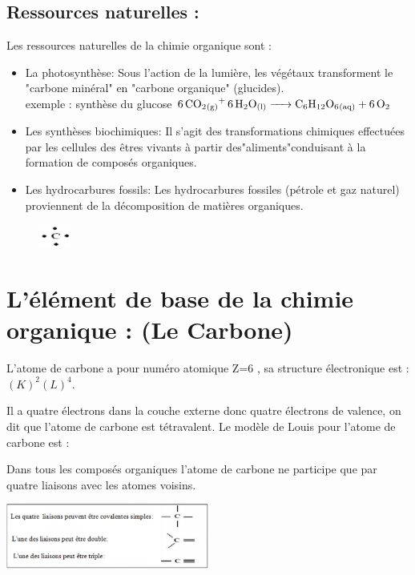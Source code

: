 \documentclass[12pt]{article}
\begin{document}
  \subsection{Ressources naturelles : }
Les ressources naturelles de la chimie organique sont : 
  \begin{itemize}
      \item La photosynthèse: Sous l'action de la lumière, les végétaux transforment le "carbone minéral" en "carbone organique" (glucides).
        \\exemple : synthèse du glucose $\ce{6{CO_2}_{(g)}+ 6{H_2O}_{(l)} -> {C_6H_{12}O_6}_{(aq)} + 6O_2  }$
        \item Les synthèses biochimiques:
Il s'agit des transformations chimiques effectuées par les cellules des êtres vivants à partir des"aliments"conduisant
à la formation de composés organiques.
\item Les hydrocarbures fossils:
Les hydrocarbures fossiles (pétrole et gaz naturel) proviennent de la décomposition de matières organiques.

  \end{itemize}
  \begin{figure}
    \includegraphics[width=0.1\textwidth]{./img/carbone_foem.png}
\end{figure}

  \section{ L'élément de base de la chimie organique : (Le Carbone)}
  L'atome de carbone a pour numéro atomique Z=6 , sa structure électronique est : $(K)^2(L)^4$.

Il a quatre électrons dans la couche externe donc quatre électrons de valence, on dit que l'atome de carbone est
tétravalent.
Le modèle de Louis pour l'atome de carbone est :


Dans tous les composés organiques l'atome de carbone ne participe que par quatre liaisons avec les atomes voisins.
  \begin{center}
    \includegraphics[width=0.5\textwidth]{./img/four_carbone.png}
    \end{center}
\end{document}
